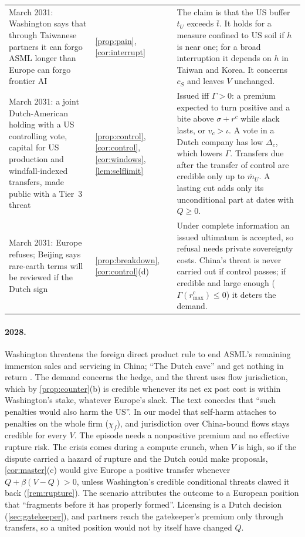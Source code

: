 \begin{table}[!tp]
\begin{tabularx}{\textwidth}{@{}>{\raggedright\arraybackslash}p{3.6cm}>{\raggedright\arraybackslash}p{2.3cm}>{\raggedright\arraybackslash}X@{}}
\addlinespace
March 2031: Washington says that through Taiwanese partners it can forgo ASML longer than Europe can forgo frontier AI &
\cref{prop:pain}, \cref{cor:interrupt} &
The claim is that the US buffer $t_U$ exceeds $\bar t$. It holds for a measure confined to US soil if $h$ is near one; for a broad interruption it depends on $h$ in Taiwan and Korea. It concerns $c_S$ and leaves $V$ unchanged.\\
\addlinespace
March 2031: a joint Dutch-American holding with a US controlling vote, capital for US production and windfall-indexed transfers, made public with a Tier~3 threat &
\cref{prop:control}, \cref{cor:control}, \cref{cor:windows}, \cref{lem:selflimit} &
Issued iff $\Gamma>0$: a premium expected to turn positive and a bite above $\sigma+r^c$ while slack lasts, or $v_c>\iota$. A vote in a Dutch company has low $\Delta_c$, which lowers $\Gamma$. Transfers due after the transfer of control are credible only up to $\bar m_U$. A lasting cut adds only its unconditional part at dates with $Q\ge 0$.\\
\addlinespace
March 2031: Europe refuses; Beijing says rare-earth terms will be reviewed if the Dutch sign &
\cref{prop:breakdown}, \cref{cor:control}(d) &
Under complete information an issued ultimatum is accepted, so refusal needs private sovereignty costs. China's threat is never carried out if control passes; if credible and large enough ($\Gamma(r^c_{\max})\le 0$) it deters the demand.\\
\bottomrule
\end{tabularx}
\end{table}

\paragraph{2028.} Washington threatens the foreign direct product rule to end ASML's remaining immersion sales and servicing in China; ``The Dutch cave'' and get nothing in return \citep{juijn2026europe}. The demand concerns the hedge, and the threat uses flow jurisdiction, which by \cref{prop:counter}(b) is credible whenever its net ex post cost is within Washington's stake, whatever Europe's slack. The text concedes that ``such penalties would also harm the US''. In our model that self-harm attaches to penalties on the whole firm ($\chi_f$), and jurisdiction over China-bound flows stays credible for every $V$. The episode needs a nonpositive premium and no effective rupture risk. The crisis comes during a compute crunch, when $V$ is high, so if the dispute carried a hazard of rupture and the Dutch could make proposals, \cref{cor:master}(c) would give Europe a positive transfer whenever $Q+\beta(V-Q)>0$, unless Washington's credible conditional threats clawed it back (\cref{rem:rupture}). The scenario attributes the outcome to a European position that ``fragments before it has properly formed''. Licensing is a Dutch decision (\cref{sec:gatekeeper}), and partners reach the gatekeeper's premium only through transfers, so a united position would not by itself have changed $Q$.

